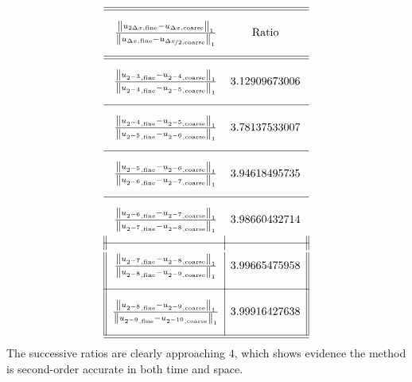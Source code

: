 \documentclass{article} %
\theoremstyle{plain}
\newcommand{\Dx}{\Delta x}
\numberwithin{equation}{section} %
\numberwithin{figure}{section} %
\numberwithin{table}{section} %
\begin{document}
\begin{align*}
    \begin{array}{||c|c||}\hline\hline
        \vphantom{\frac{\dfrac{1}{1}}{\dfrac{1}{1}}}\frac{\norm{u_{2\Dx,\text{fine}} - u_{\Dx,\text{coarse}}}_1}{\norm{u_{\Dx,\text{fine}} - u_{\nicefrac{\Dx}{2},\text{coarse}}}_1} & \text{Ratio} \\\hline\hline
        \vphantom{\frac{\dfrac{1}{1}}{\dfrac{1}{1}}}\frac{\norm{u_{2^{-3},\text{fine}} - u_{2^{-4},\text{coarse}}}_1}{\norm{u_{2^{-4},\text{fine}} - u_{2^{-5},\text{coarse}}}_1} & 3.12909673006 \\\hline
        \vphantom{\frac{\dfrac{1}{1}}{\dfrac{1}{1}}}\frac{\norm{u_{2^{-4},\text{fine}} - u_{2^{-5},\text{coarse}}}_1}{\norm{u_{2^{-5},\text{fine}} - u_{2^{-6},\text{coarse}}}_1} & 3.78137533007 \\\hline
        \vphantom{\frac{\dfrac{1}{1}}{\dfrac{1}{1}}}\frac{\norm{u_{2^{-5},\text{fine}} - u_{2^{-6},\text{coarse}}}_1}{\norm{u_{2^{-6},\text{fine}} - u_{2^{-7},\text{coarse}}}_1} & 3.94618495735 \\\hline
        \vphantom{\frac{\dfrac{1}{1}}{\dfrac{1}{1}}}\frac{\norm{u_{2^{-6},\text{fine}} - u_{2^{-7},\text{coarse}}}_1}{\norm{u_{2^{-7},\text{fine}} - u_{2^{-8},\text{coarse}}}_1} & 3.98660432714 \\\hline
        \vphantom{\frac{\dfrac{1}{1}}{\dfrac{1}{1}}}\frac{\norm{u_{2^{-7},\text{fine}} - u_{2^{-8},\text{coarse}}}_1}{\norm{u_{2^{-8},\text{fine}} - u_{2^{-9},\text{coarse}}}_1} & 3.99665475958 \\\hline
        \vphantom{\frac{\dfrac{1}{1}}{\dfrac{1}{1}}}\frac{\norm{u_{2^{-8},\text{fine}} - u_{2^{-9},\text{coarse}}}_1}{\norm{u_{2^{-9},\text{fine}} - u_{2^{-10},\text{coarse}}}_1} & 3.99916427638 \\\hline\hline
    \end{array}
\end{align*}
The successive ratios are clearly approaching $4$, which shows evidence the method is second-order accurate in both time and space.
\end{document}
